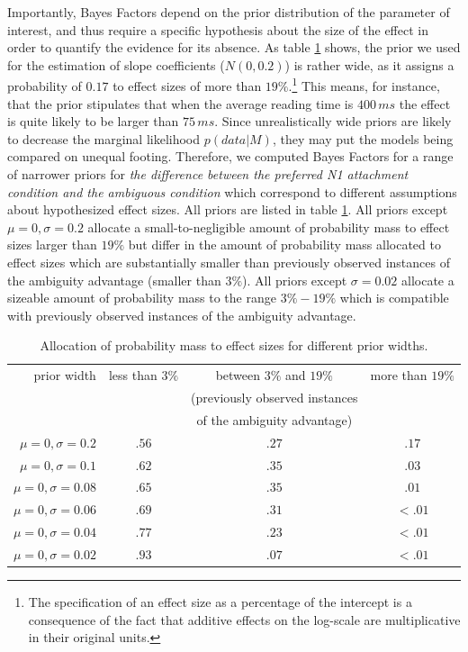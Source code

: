 \documentclass[english, doc]{apa7}\usepackage[]{graphicx}\usepackage[]{color}
\begin{document}
Importantly, Bayes Factors depend on the prior distribution of the parameter of interest, and thus require a specific hypothesis about the size of the effect in order to quantify the evidence for its absence.
As table \ref{tab:prior_widths} shows, the prior we used for the estimation of slope coefficients ($N(0, 0.2)$) is rather wide, as it assigns a probability of $0.17$ to effect sizes of more than $19\%$.\footnote{The specification of an effect size as a percentage of the intercept is a consequence of the fact that additive effects on the log-scale are multiplicative in their original units.} 
This means, for instance, that the prior stipulates that when the average reading time is $400\,ms$ the effect is quite likely to be larger than $75\,ms$. 
Since unrealistically wide priors are likely to decrease the marginal likelihood  $p(data|M)$, they may put the models being compared on unequal footing. Therefore, we computed Bayes Factors for a range of narrower priors for \textit{the difference between the preferred N1 attachment condition and the ambiguous condition} which correspond to different assumptions about hypothesized effect sizes. All priors are listed in table \ref{tab:prior_widths}. All priors except $\mu=0, \sigma=0.2$ allocate a small-to-negligible amount of probability mass to effect sizes larger than $19\%$ but differ in the amount of probability mass allocated to effect sizes which are substantially smaller than previously observed instances of the ambiguity advantage (smaller than $3\%$). All priors except $\sigma=0.02$ allocate a sizeable amount of probability mass to the range $3\%-19\%$ which is compatible with previously observed instances of the ambiguity advantage.



{\color{red}
\begin{table}[]
    \caption{Allocation of probability mass to effect sizes for different prior widths.}
    \label{tab:prior_widths}
    \centering
    
    \begin{tabular}{r|c|c|c}
        \hline
        prior width & less than $3\%$  & between $3\%$ and $19\%$ & more than $19\%$ \\
         &  & (previously observed instances & \\
         &  & of the ambiguity advantage) & \\
        \hline
         $\mu=0, \sigma = 0.2$  & $.56$ & $.27$ & $.17$ \\ %
         $\mu=0, \sigma = 0.1$  & $.62$ & $.35$ & $.03$ \\ %
         $\mu=0, \sigma = 0.08$ & $.65$ & $.35$ & $.01$ \\ %
         $\mu=0, \sigma = 0.06$ & $.69$ & $.31$ & $<.01$ \\ %
         $\mu=0, \sigma = 0.04$ & $.77$ & $.23$ & $<.01$ \\ %
         $\mu=0, \sigma = 0.02$ & $.93$ & $.07$ & $<.01$ \\ %
        \hline
    \end{tabular}
\end{table}
}
\end{document}
